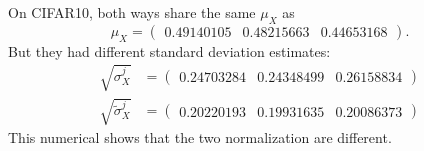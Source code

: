 \begin{example}


On CIFAR10, both ways share the same $\mu_X$ as
\begin{equation}\label{key}
\mu_X = \begin{pmatrix}
0.49140105 & 0.48215663 & 0.44653168
\end{pmatrix}.
\end{equation}
But they had different standard deviation estimates:
\begin{equation}
\begin{aligned}
\sqrt{\sigma_X^j} &= \begin{pmatrix}
0.24703284 & 0.24348499 & 0.26158834
\end{pmatrix} \\
\sqrt{\tilde \sigma_X^j} &= \begin{pmatrix}
0.20220193 & 0.19931635 & 0.20086373
\end{pmatrix} 
\end{aligned}
\end{equation}
This numerical shows that the two normalization are different.
\end{example}

\endinput


\subsubsection{Data normalization for images}
For images, consider we have a color image data set $(X,Y) := \{(x_i, y_i)\}_{i=1}^N$ where
\begin{equation}\label{key}
x_i \in \mathbb{R}^{3 \times m\times n}.
\end{equation}
We further denote these the $(s,t)$ pixel value for data $x_i$ at channel $j$ as:
\begin{equation}\label{key}
[x_i]_{j;st} \longleftrightarrow (s,t) \text{ pixel value for } x_i \text{ at channel } j,
\end{equation}
where $1\le i \le N, 1\le j\le 3, 1\le s \le m$, and  $1\le j\le n$.

